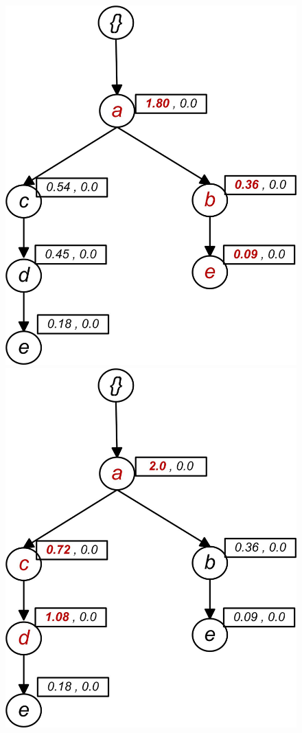 \begin{figure}
\begin{minipage}{0.20\textwidth}
  \centering
  \includegraphics[width=\textwidth]{images/sim_02.jpg}
\end{minipage}
\hfill
\begin{minipage}{0.20\textwidth}
  \centering
  \includegraphics[width=\textwidth]{images/sim_03.jpg}

\end{minipage}
\end{figure}
